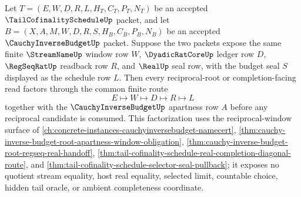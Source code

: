 \begin{theorem}
\label{thm:tail-cofinality-schedule-cauchy-inverse-budget-factorization}
Let $T=(E,W,D,R,L,H_T,C_T,P_T,N_T)$ be an accepted
$\TailCofinalityScheduleUp$ packet, and let
$B=(X,A,M,W,D,R,S,H_B,C_B,P_B,N_B)$ be an accepted
$\CauchyInverseBudgetUp$ packet. Suppose the two packets expose the same
finite $\StreamNameUp$ window row $W$, $\DyadicRatCoreUp$ ledger row $D$,
$\RegSeqRatUp$ readback row $R$, and $\RealUp$ seal row, with the budget seal
$S$ displayed as the schedule row $L$. Then every reciprocal-root or
completion-facing read factors through the common finite route
$$
E \longmapsto W \longmapsto D \longmapsto R \longmapsto L
$$
together with the $\CauchyInverseBudgetUp$ apartness row $A$ before any
reciprocal candidate is consumed. This factorization uses the
reciprocal-window surface of
\autoref{ch:concrete-instances-cauchyinversebudget-namecert},
\autoref{thm:cauchy-inverse-budget-root-apartness-window-obligation},
\autoref{thm:cauchy-inverse-budget-root-regseq-real-handoff},
\autoref{thm:tail-cofinality-schedule-real-completion-diagonal-route}, and
\autoref{thm:tail-cofinality-schedule-selector-seal-pullback}; it exposes no
quotient stream equality, host real equality, selected limit, countable
choice, hidden tail oracle, or ambient completeness coordinate.
\end{theorem}
